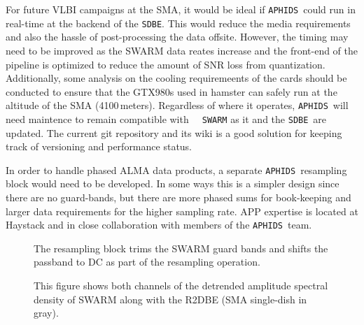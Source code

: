 \documentclass[11pt,preprint]{aastex}
\newcommand{\SWARM}[1]{\texttt{#1\,SWARM}}
\newcommand{\SDBE}{\texttt{SDBE}}
\newcommand{\APHIDS}{\texttt{APHIDS}}
\begin{document}
For future VLBI campaigns at the SMA, it would be ideal if \APHIDS\, could run in real-time 
at the backend of the \SDBE.  This would reduce the media requirements and also the 
hassle of post-processing the data offsite.  However, the timing may need to be improved as the
SWARM data reates increase and the front-end of the pipeline is  optimized to reduce the 
amount of SNR loss from quantization.  Additionally, some analysis on the cooling requiremeents 
of the cards should be conducted to ensure that the GTX980s used in hamster can safely run 
at the altitude of the SMA (4100\,meters).  Regardless of where it operates, \APHIDS\, will need 
maintence to remain compatible with \SWARM\, as it and the \SDBE\, are updated.  The current 
git repository and its wiki is a good solution for keeping track of versioning and performance status.

In order to handle phased ALMA data products, a separate \APHIDS\, resampling block would need 
to be developed.  In some ways this is a simpler design since there are no guard-bands, but 
there are more phased sums for book-keeping and larger data requirements for the higher 
sampling rate. APP expertise is located at Haystack and in close collaboration with members of 
the \APHIDS\, team.  

\begin{figure}
\centering
{}
\label{fig:resampling_block}
\caption{The resampling block trims the SWARM guard bands and shifts the passband to DC as part of the 
resampling operation.}
\end{figure}

\begin{figure}[H]
\caption{This figure shows both channels of the detrended amplitude spectral density of SWARM along with the 
R2DBE (SMA single-dish in gray).}
\label{fig:swarm_amp_spec}
\end{figure}
\end{document}
